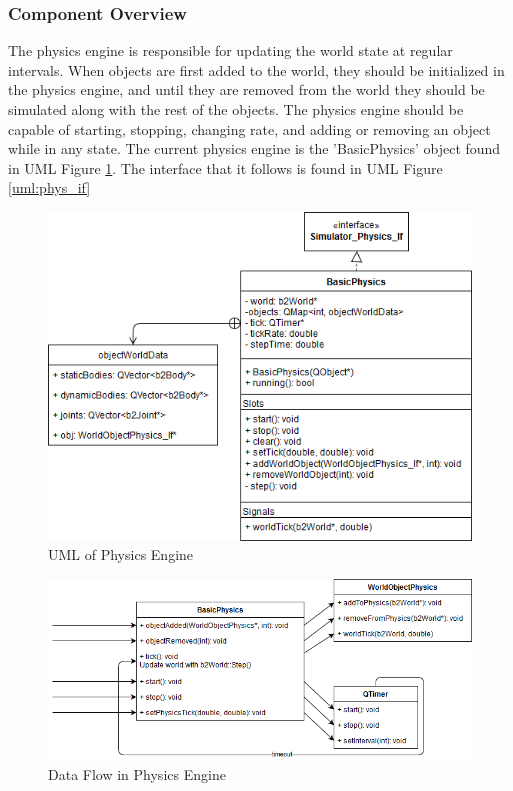 \subsubsection*{Component  Overview}
The physics engine is responsible for updating the world state at regular intervals. When objects are first added to the world, they should be initialized in the physics engine, and until they are removed from the world they should be simulated along with the rest of the objects. The physics engine should be capable of starting, stopping, changing rate, and adding or removing an object while in any state. The current physics engine is the 'BasicPhysics' object found in UML Figure \ref{uml:physics}. The interface that it follows is found in UML Figure \ref{uml:phys_if}

 \begin{figure}[h]
 	\begin{center}
 	\includegraphics[scale=0.5]{./images_design/uml/BasicPhysics}
 	\caption{UML of Physics Engine\label{uml:physics}}
 	\end{center}
 \end{figure}

 \begin{figure}
 	\begin{center}
 	\includegraphics[scale=0.5]{./images_design/uml/DataFlow_physics}
 	\caption{Data Flow in Physics Engine\label{uml:dataflow_physics}}
 	\end{center}
 \end{figure}

